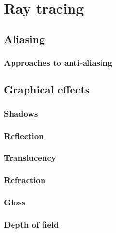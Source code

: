 \section{Ray tracing}

\subsection{Aliasing}

\subsubsection{Approaches to anti-aliasing}

\subsection{Graphical effects}

\subsubsection{Shadows}

\subsubsection{Reflection}

\subsubsection{Translucency}

\subsubsection{Refraction}

\subsubsection{Gloss}

\subsubsection{Depth of field}